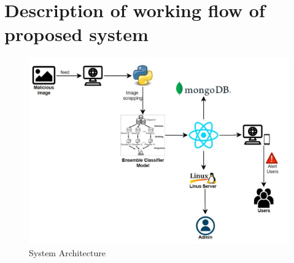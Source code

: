 \section{Description of working flow of proposed system}
\begin{figure}[H]
    \includegraphics[width=180mm]{./img/System architecture.jpg}
    \caption{System Architecture}
\end{figure}
\clearpage 
